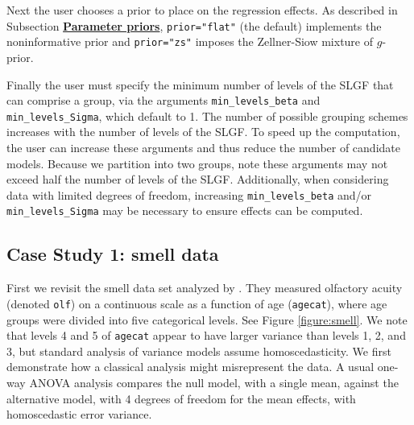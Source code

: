 Next the user chooses a prior to place on the regression effects. As described in Subsection \hyperlink{subsection:priors}{\textbf{Parameter priors}}, \texttt{prior="flat"} (the default) implements the noninformative prior and \texttt{prior="zs"} imposes the Zellner-Siow mixture of $g$-prior.  

Finally the user must specify the minimum number of levels of the SLGF that can comprise a group, via the arguments \texttt{min\_levels\_beta} and \texttt{min\_levels\_Sigma}, which default to 1. The number of possible grouping schemes increases with the number of levels of the SLGF. To speed up the computation, the user can increase these arguments and thus reduce the number of candidate models. Because we partition into two groups, note these arguments may not exceed half the number of levels of the SLGF. Additionally, when considering data with limited degrees of freedom, increasing \texttt{min\_levels\_beta} and/or \texttt{min\_levels\_Sigma} may be necessary to ensure effects can be computed. 

\subsection{Case Study 1: smell data}\hypertarget{subsection:smell}{}

First we revisit the smell data set analyzed by \citet{smell}. They measured olfactory acuity (denoted \texttt{olf}) on a continuous scale as a function of age (\texttt{agecat}), where age groups were divided into five categorical levels. See Figure \ref{figure:smell}. We note that levels 4 and 5 of \texttt{agecat} appear to have larger variance than levels 1, 2, and 3, but standard analysis of variance models assume homoscedasticity. We first demonstrate how a classical analysis might misrepresent the data. A usual one-way ANOVA analysis compares the null model, with a single mean, against the alternative model, with 4 degrees of freedom for the mean effects, with homoscedastic error variance. 

